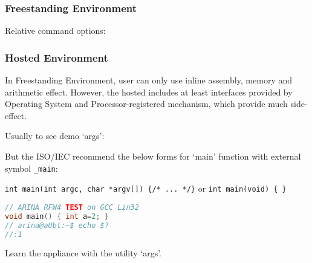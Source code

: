 
\subsubsection{Freestanding Environment}

Relative command options: %

\subsubsection{Hosted Environment}

In Freestanding Environment, user can only use inline assembly, memory and arithmetic effect. However, the hosted includes at least interfaces provided by Operating System and Processor-registered mechanism, which provide much side-effect.

Usually to see demo `args':

\lstset{style=GlobalC}


But the ISO/IEC recommend the below forms for `main' function with external symbol \verb`_main`:

\verb`int main(int argc, char *argv[]) {/* ... */}` or 
\verb`int main(void) { }`

\begin{lstlisting}[language=C]
// ARINA RFW4 TEST on GCC Lin32
void main() { int a=2; }
// arina@aUbt:~$ echo $?
//:1
\end{lstlisting}

Learn the appliance with the utility `args'.

